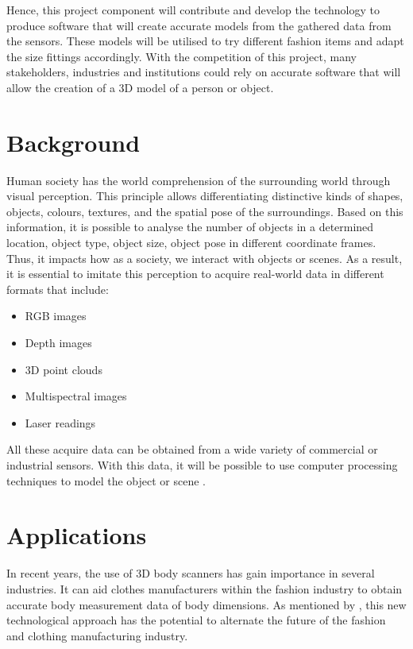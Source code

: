 \documentclass[12pt]{report}
\begin{document}
Hence, this project component will contribute and develop the technology to produce software that will create accurate models from the gathered data from the sensors. These models will be utilised to try different fashion items and adapt the size fittings accordingly. 
With the competition of this project, many stakeholders, industries and institutions could rely on accurate software that will allow the creation of a 3D model of a person or object.


\enlargethispage{\baselineskip}

\section{Background}
Human society has the world comprehension of the surrounding world through visual perception. This principle allows differentiating distinctive kinds of shapes, objects, colours, textures, and the spatial pose of the surroundings.
Based on this information, it is possible to analyse the number of objects in a determined location, object type, object size, object pose in different coordinate frames. 
Thus, it impacts how as a society, we interact with objects or scenes. As a result, it is essential to imitate this perception  to acquire real-world data in different formats that include:

\begin{itemize}[]
  \itemsep0em 
     \item RGB images
     \item Depth images
     \item 3D point clouds 
     \item Multispectral images
     \item Laser readings
\end{itemize}
All these acquire data can be obtained from a wide variety of commercial or industrial sensors. With this data, it will be possible to use computer processing techniques  to model the object or scene \citep*{murcia_monroy_mora_2018}.

\section{Applications}
In recent years, the use of 3D body scanners has gain importance in several industries. It can aid clothes manufacturers within the fashion industry to obtain accurate body measurement data of body dimensions.
As mentioned by \citet*{sturm_bylow_kahl_cremers_2013}, this new technological approach has the potential to alternate the future of the fashion and clothing manufacturing industry.
\end{document}
